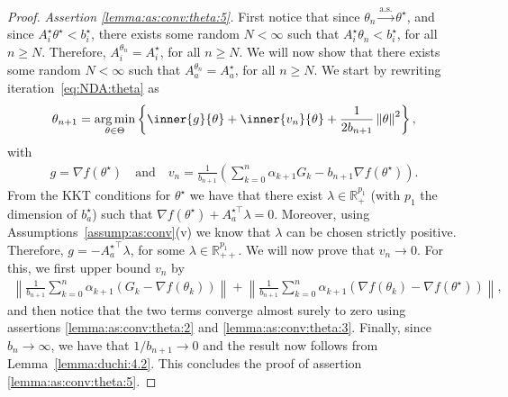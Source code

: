 \documentclass[11pt,a4paper]{article}
\theoremstyle{definition}
\DeclareMathOperator*{\argmin}{arg\,min}
\begin{document}
\begin{proof}
\emph{Assertion \ref{lemma:as:conv:theta:5}.} First notice that since $\theta_n \overset{\text{a.s.}}{\to} \theta^\star$, and since $A_{i}^\star \theta^\star < b_i^\star$, there exists some random $N < \infty$ such that $A_{i}^\star \theta_n < b_i^\star$, for all $n \geq N$. Therefore, $A_{i}^{\theta_n} = A_{i}^\star$, for all $n \geq N$. We will now show that there exists some random $N < \infty$ such that $A_{a}^{\theta_n} = A_{a}^\star$, for all $n \geq N$. We start by rewriting iteration~\eqref{eq:NDA:theta} as
\begin{align*}
    \theta_{n+1} = \argmin_{\theta \in \Theta} \left\{ \inner{g}{\theta} + \inner{v_n}{\theta} +\frac{1}{2 b_{n+1}} \left\| \theta \right\|^2\right\},
\end{align*}
with 
\begin{align*}
    g = \nabla {f}(\theta^\star) \quad \text{and} \quad  
    v_n = \frac{1}{b_{n+1}} \left(\sum_{k=0}^n \alpha_{k+1} G_k - b_{n+1} \nabla {f}(\theta^\star) \right).
\end{align*}
From the KKT conditions for $\theta^\star$ we have that there exist $\lambda \in \mathbb R_{+}^{p_1}$ (with $p_1$ the dimension of $b_a^\star$) such that $\nabla {f}(\theta^\star) + A_a^{\star \top} \lambda = 0$. Moreover, using Assumptions~\ref{assump:as:conv}(v) we know that $\lambda$ can be chosen strictly positive. Therefore, $g = -{A_a^\star}^\top \lambda$, for some $\lambda \in \mathbb R_{++}^{p_1}$. We will now prove that $v_n \to 0$. For this, we first upper bound $v_n$ by
\begin{align*}
    \left\| \frac{1}{b_{n+1}} \sum_{k=0}^n \alpha_{k+1} \left(G_k - \nabla{f}(\theta_k) \right) \right\| + \left\| \frac{1}{b_{n+1}} \sum_{k=0}^n \alpha_{k+1} \left(\nabla{f}(\theta_k) - \nabla{f}(\theta^\star) \right) \right\|,
\end{align*}
and then notice that the two terms converge almost surely to zero using assertions \ref{lemma:as:conv:theta:2} and \ref{lemma:as:conv:theta:3}. Finally, since $b_{n} \to \infty$, we have that $1/b_{n+1} \to 0$ and the result now follows from Lemma~\ref{lemma:duchi:4.2}. This concludes the proof of assertion \ref{lemma:as:conv:theta:5}.
\end{proof}
\end{document}
